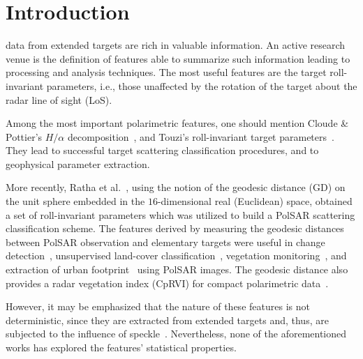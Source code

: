 \documentclass[journal]{IEEEtran}
\begin{document}
	\IEEEpeerreviewmaketitle
	
	\section{Introduction}
	
	data from extended targets are rich in valuable information.
	An active research venue is the definition of features able to summarize such information leading to processing and analysis techniques.
	The most useful features are the target roll-invariant parameters, i.e., those unaffected by the rotation of the target about the radar line of sight (LoS).
	
	Among the most important polarimetric features, one should mention Cloude \& Pottier's $H/\alpha$ decomposition~\cite{CloudePottier:97}, and Touzi's roll-invariant target parameters~\cite{Touzi:TGARS:2007}.
	They lead to successful target scattering classification procedures, and to geophysical parameter extraction.
	
	More recently, Ratha et al.~\cite{APolSARScatteringPowerFactorizationFrameworkandNovelRollInvariantParametersBasedUnsupervisedClassificationSchemeUsingaGeodesicDistanceinpress}, using the notion of the geodesic distance ($\text{GD}$) on the unit sphere embedded in the $16$-dimensional real (Euclidean) space, obtained a set of roll-invariant parameters which was utilized to build a PolSAR scattering classification scheme. 
	The features derived by measuring the geodesic distances between PolSAR observation and elementary targets were useful in
	change detection~\cite{ChangeDetectionPolSARGeodesicDistanceBetweenScatteringMechanisms},
	unsupervised land-cover classification~\cite{ClassificationPolSARGeodesic}, 
	vegetation monitoring~\cite{AGeneralizedVolumeScatteringModelBasedVegetationIndexfromPolarimetricSARData2019}, and 
	extraction of urban footprint~\cite{NovelTechniquesforBuiltupAreaExtractionfromPolarimetricSARImages2019} using PolSAR images.
	The geodesic distance also provides a radar vegetation index (CpRVI) for compact polarimetric data~\cite{ARadarVegetationIndexforCropMonitoringUsingCompactPolarimetricSARData}. 
	
	However, it may be emphasized that the nature of these features is not deterministic, since they are extracted from extended targets and, thus, are subjected to the influence of speckle~\cite{Deng_2017}.
	Nevertheless, none of the aforementioned works has explored the features' statistical properties.
	
\end{document}
